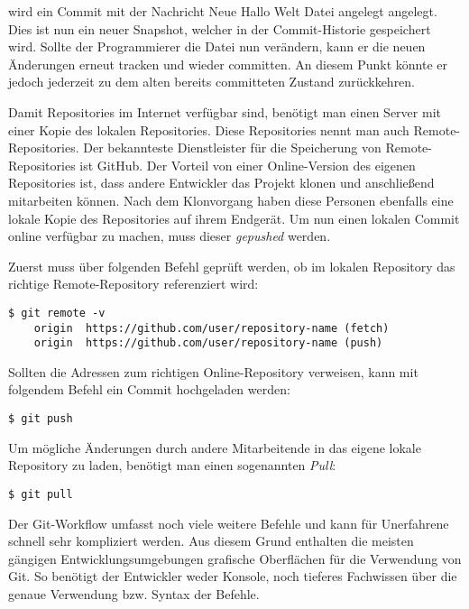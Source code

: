wird ein Commit mit der Nachricht \glqq Neue Hallo Welt Datei angelegt\grqq{}
angelegt. Dies ist nun ein neuer Snapshot, welcher in der Commit-Historie
gespeichert wird. Sollte der Programmierer die Datei nun verändern, kann er die
neuen Änderungen erneut tracken und wieder committen. An diesem Punkt könnte er
jedoch jederzeit zu dem alten bereits committeten Zustand zurückkehren.

Damit Repositories im Internet verfügbar sind, benötigt man einen Server mit
einer Kopie des lokalen Repositories. Diese Repositories nennt man auch
Remote-Repositories. Der bekannteste Dienstleister für die Speicherung
von Remote-Repositories ist GitHub. Der Vorteil von einer Online-Version des
eigenen Repositories ist, dass andere Entwickler das Projekt klonen und
anschließend mitarbeiten können. Nach dem Klonvorgang haben diese Personen
ebenfalls eine lokale Kopie des Repositories auf ihrem Endgerät. Um nun einen
lokalen Commit online verfügbar zu machen, muss dieser \emph{gepushed} werden.

Zuerst muss über folgenden Befehl geprüft werden, ob im lokalen Repository das
richtige Remote-Repository referenziert wird:

\begin{lstlisting}[style=Bash]
    $ git remote -v
    origin	https://github.com/user/repository-name (fetch)
    origin	https://github.com/user/repository-name (push)
\end{lstlisting}

Sollten die Adressen zum richtigen Online-Repository verweisen, kann mit
folgendem Befehl ein Commit hochgeladen werden:

\begin{lstlisting}[style=Bash]
    $ git push
\end{lstlisting}

Um mögliche Änderungen durch andere Mitarbeitende in das eigene lokale
Repository zu laden, benötigt man einen sogenannten \emph{Pull}:

\begin{lstlisting}[style=Bash]
    $ git pull
\end{lstlisting}

Der Git-Workflow umfasst noch viele weitere Befehle und kann für Unerfahrene
schnell sehr kompliziert werden. Aus diesem Grund enthalten die meisten gängigen
Entwicklungsumgebungen grafische Oberflächen für die Verwendung von Git. So
benötigt der Entwickler weder Konsole, noch tieferes Fachwissen über die genaue
Verwendung bzw. Syntax der Befehle.

